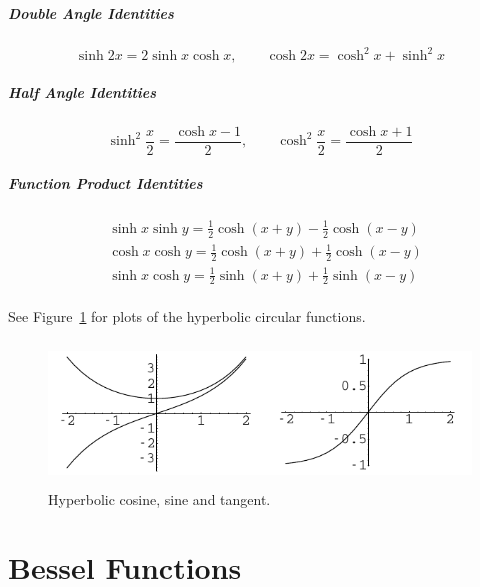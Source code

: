 \paragraph{Double Angle Identities}
\[\sinh 2x = 2 \sinh x \cosh x, \qquad \cosh 2x = \cosh^2 x + \sinh^2 x \]


\paragraph{Half Angle Identities}
\[\sinh^2 \frac{x}{2} = \frac{\cosh x - 1}{2}, \qquad
\cosh^2 \frac{x}{2} = \frac{\cosh x + 1}{2} \]

\paragraph{Function Product Identities}
\begin{align*}
  &\sinh x \sinh y = \frac{1}{2} \cosh(x+y) - \frac{1}{2} \cosh(x-y) \\
  &\cosh x \cosh y = \frac{1}{2} \cosh(x+y) + \frac{1}{2} \cosh(x-y) \\
  &\sinh x \cosh y = \frac{1}{2} \sinh(x+y) + \frac{1}{2} \sinh(x-y) \\
\end{align*}

See Figure~\ref{sicotanh} for plots of the hyperbolic
circular functions.

\begin{figure}[h!]
  \begin{center}
    \includegraphics[height=1.5in]{appendix/sicotanh}
  \end{center}
  \caption{Hyperbolic cosine, sine and tangent.}
  \label{sicotanh}
\end{figure}









\raggedbottom
\chapter{Bessel Functions}
\flushbottom

